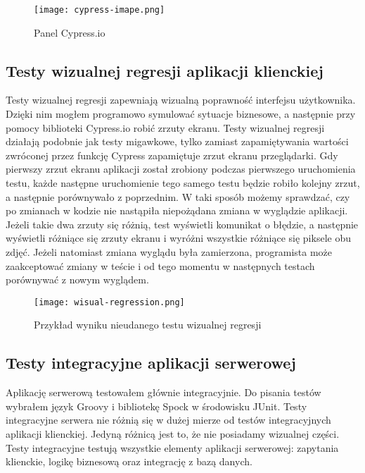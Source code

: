 \begin{figure}
    \texttt{[image: cypress-imape.png]}
    \caption{Panel Cypress.io} \label{fig-cypress}
\end{figure}

\subsection{Testy wizualnej regresji aplikacji klienckiej}
Testy wizualnej regresji zapewniają wizualną poprawność interfejsu użytkownika. Dzięki nim mogłem programowo symulować sytuacje biznesowe, a następnie przy pomocy biblioteki Cypress.io robić zrzuty ekranu. Testy wizualnej regresji działają podobnie jak testy migawkowe, tylko zamiast zapamiętywania wartości zwróconej przez funkcję Cypress zapamiętuje zrzut ekranu przeglądarki. Gdy pierwszy zrzut ekranu aplikacji został zrobiony podczas pierwszego uruchomienia testu, każde następne uruchomienie tego samego testu będzie robiło kolejny zrzut, a następnie porównywało z poprzednim. W taki sposób możemy sprawdzać, czy po zmianach w kodzie nie nastąpiła niepożądana zmiana w wyglądzie aplikacji. Jeżeli takie dwa zrzuty się różnią, test wyświetli komunikat o błędzie, a następnie wyświetli różniące się zrzuty ekranu i wyróżni wszystkie różniące się piksele obu zdjęć. Jeżeli natomiast zmiana wyglądu była zamierzona, programista może zaakceptować zmiany w teście i od tego momentu w następnych testach porównywać z nowym wyglądem.

\begin{figure}
    \texttt{[image: wisual-regression.png]}
    \caption{Przykład wyniku nieudanego testu wizualnej regresji} \label{fig-cypress-vr}
\end{figure}


\subsection{Testy integracyjne aplikacji serwerowej}
Aplikację serwerową testowałem głównie integracyjnie. Do pisania testów wybrałem język Groovy i bibliotekę Spock w środowisku JUnit. Testy integracyjne serwera nie różnią się w dużej mierze od testów integracyjnych aplikacji klienckiej. Jedyną różnicą jest to, że nie posiadamy wizualnej części. Testy integracyjne testują wszystkie elementy aplikacji serwerowej: zapytania klienckie, logikę biznesową oraz integrację z bazą danych.
